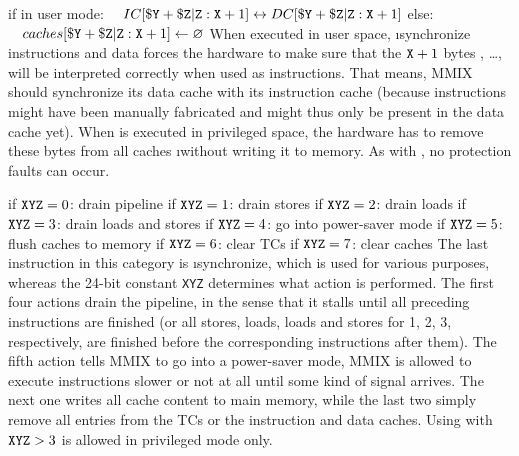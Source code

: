 \instrtblfour
	{}
	{if in user mode:}
	{$\quad IC[{\tt \$Y} + {\tt \$Z}{\tt|Z}:{\tt X}+1] \leftrightarrow DC[{\tt \$Y} + {\tt \$Z}{\tt|Z}:{\tt X}+1]$}
	{else:}
	{$\quad caches[{\tt \$Y} + {\tt \$Z}{\tt|Z}:{\tt X}+1] \leftarrow \varnothing$}
\noindent When executed in user space, \i{synchronize instructions and data} forces the hardware to make sure that the ${\tt X}+1$ bytes , \dots,  will be interpreted correctly when used as instructions. That means, MMIX should synchronize its data cache with its instruction cache (\eg because instructions might have been manually fabricated and might thus only be present in the data cache yet). When  is executed in privileged space, the hardware has to remove these bytes from all caches \i{without} writing it to memory. As with , no protection faults can occur. \citep[pg. 24,25]{mmix-doc}

\instrtbleight
	{}
	{if ${\tt XYZ} = 0$: drain pipeline}
	{if ${\tt XYZ} = 1$: drain stores}
	{if ${\tt XYZ} = 2$: drain loads}
	{if ${\tt XYZ} = 3$: drain loads and stores}
	{if ${\tt XYZ} = 4$: go into power-saver mode}
	{if ${\tt XYZ} = 5$: flush caches to memory}
	{if ${\tt XYZ} = 6$: clear TCs}
	{if ${\tt XYZ} = 7$: clear caches}
\noindent The last instruction in this category is \i{synchronize}, which is used for various purposes, whereas the 24-bit constant {\tt XYZ} determines what action is performed. The first four actions drain the pipeline, in the sense that it stalls until all preceding instructions are finished (or all stores, loads, loads and stores for 1, 2, 3, respectively, are finished before the corresponding instructions after them). The fifth action tells MMIX to go into a power-saver mode, \ie MMIX is allowed to execute instructions slower or not at all until some kind of signal arrives. The next one writes all cache content to main memory, while the last two simply remove all entries from the TCs or the instruction and data caches. Using  with ${\tt XYZ} > 3$ is allowed in privileged mode only. \citep[pg. 25]{mmix-doc}

